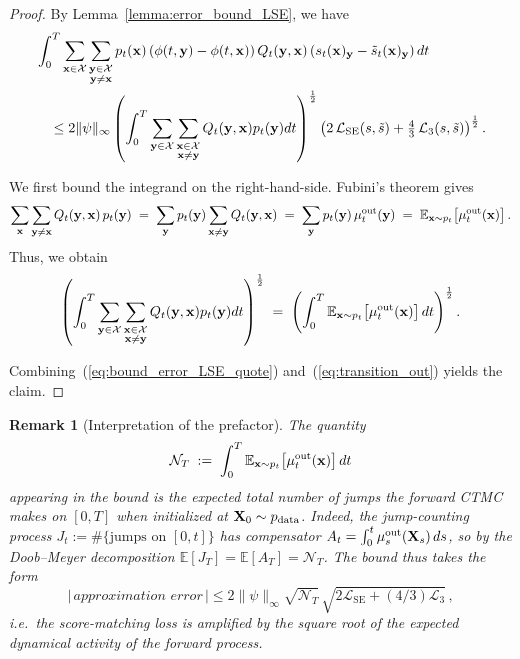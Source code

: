\documentclass{article} %
\newtheorem{remark}[theorem]{Remark}
\def\eqref#1{equation~\ref{#1}}
\newcommand{\bfX}{{\bf X}}
\newcommand{\bfx}{{\bf x}}
\newcommand{\bfy}{ {\bf y}}
\newcommand{\LSE}{\mathcal{L}_{\mathrm{SE}}}
\renewcommand{\eqref}[1]{\textup{(\ref{#1})}}
\newcommand{\LThree}{\mathcal{L}_{3}}
\begin{document}
\begin{proof}
By Lemma~\ref{lemma:error_bound_LSE}, we have
\begin{align}
\begin{split}\label{eq:bound_error_LSE_quote}
        &\int_0^T \sum_{\substack{\bfx\in\mathcal{X}}} \sum_{\substack{\bfy\in\mathcal{X} \\ \bfy\neq \bfx}} p_t(\bfx) \left(\phi(t, \bfy)-\phi(t, \bfx) \right) Q_t(\bfy, \bfx) \left( s_t(\bfx)_\bfy - \tilde{s}_t(\bfx)_\bfy \right)  dt \\
        &\quad \leq 2 \| \psi\|_\infty  \left( \int_0^T \sum_{\substack{\bfy \in\mathcal{X}}} \sum_{\substack{\bfx \in\mathcal{X} \\ \bfx \neq \bfy}}  Q_t(\bfy, \bfx) p_t(\bfy)    dt \right)^{\frac{1}{2}} \left( 2\,\LSE(s, \tilde{s}) + \tfrac{4}{3}\,\LThree(s, \tilde{s}) \right)^{\frac{1}{2}}.
    \end{split}
    \end{align}

\smallskip
We first bound the integrand on the right-hand-side. Fubini's theorem gives
\[
  \sum_{\bfx} \sum_{\bfy \neq \bfx} Q_t(\bfy, \bfx)\,p_t(\bfy)
  \;=\; \sum_{\bfy} p_t(\bfy) \sum_{\bfx \neq \bfy} Q_t(\bfy, \bfx)
  \;=\; \sum_{\bfy} p_t(\bfy)\,\mu^\mathrm{out}_t(\bfy)
  \;=\; \mathbb{E}_{\bfx \sim p_t}\!\left[ \mu^\mathrm{out}_t(\bfx) \right].
\]
Thus, we obtain
\begin{equation}\label{eq:transition_out}
  \left( \int_0^T \sum_{\substack{\bfy \in\mathcal{X}}} \sum_{\substack{\bfx \in\mathcal{X} \\ \bfx \neq \bfy}}  Q_t(\bfy, \bfx) p_t(\bfy)    dt \right)^{\frac{1}{2}} \;=\;
      \left( \int_0^T \mathbb{E}_{\bfx \sim p_t}\!\left[ \mu^\mathrm{out}_t(\bfx) \right] dt \right)^{\frac{1}{2}}.
\end{equation}

Combining~\eqref{eq:bound_error_LSE_quote} and~\eqref{eq:transition_out} yields the claim.
\end{proof}
\begin{remark}[Interpretation of the prefactor]\label{rmk:exit_rate}
The quantity 
\[
  \mathcal{N}_T \;:=\; \int_0^T \mathbb{E}_{\bfx \sim p_t}\!\left[ \mu^\mathrm{out}_t(\bfx) \right] dt
\]
appearing in the bound is the \emph{expected total number of jumps} 
the forward CTMC makes on $[0, T]$ when initialized at 
$\bfX_0 \sim p_{\rm data}$. Indeed, the jump-counting process 
$J_t := \#\{\text{jumps on }[0, t]\}$ has compensator 
$A_t = \int_0^t \mu^\mathrm{out}_s(\bfX_s)\,ds$, so by the Doob--Meyer 
decomposition $\mathbb{E}[J_T] = \mathbb{E}[A_T] = \mathcal{N}_T$. 
The bound thus takes the form 
$$|\,\textit{approximation error}\,| \le 2 \|\psi\|_\infty \sqrt{\mathcal{N}_T}\,\sqrt{2\LSE + (4/3)\LThree}\, ,$$ 
i.e.\ the score-matching loss is amplified by the square root of 
the expected dynamical activity of the forward process. 
\end{remark}
\end{document}
